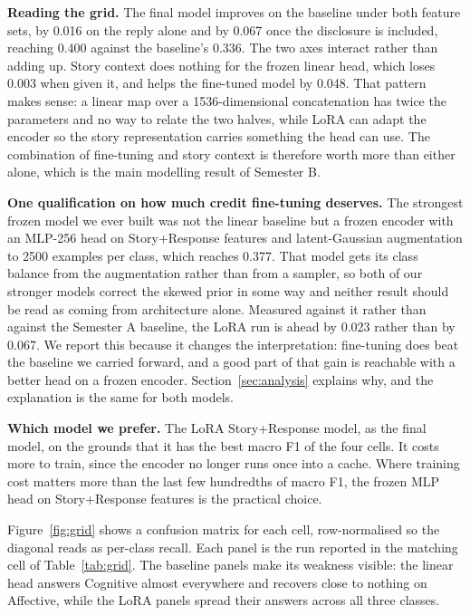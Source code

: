 \documentclass[11pt,a4paper]{article}
\begin{document}
\textbf{Reading the grid.} The final model improves on the baseline under both feature sets,
by 0.016 on the reply alone and by 0.067 once the disclosure is included, reaching 0.400
against the baseline's 0.336. The two axes interact rather than adding
up. Story context does nothing for the frozen linear head, which loses 0.003 when given it,
and helps the fine-tuned model by 0.048. That pattern makes sense: a linear map over a
1536-dimensional concatenation has twice the parameters and no way to relate the two halves,
while LoRA can adapt the encoder so the story representation carries something the head can
use. The combination of fine-tuning and story context is therefore worth more than either
alone, which is the main modelling result of Semester B.

\textbf{One qualification on how much credit fine-tuning deserves.} The strongest frozen
model we ever built was not the linear baseline but a frozen encoder with an MLP-256 head on
Story+Response features and latent-Gaussian augmentation to 2500 examples per class, which
reaches 0.377. That model gets its class balance from the augmentation rather than from a
sampler, so both of our stronger models correct the skewed prior in some way and neither
result should be read as coming from architecture alone. Measured against it rather than
against the Semester A baseline, the LoRA run is ahead by 0.023 rather than by 0.067. We
report this because it changes the interpretation: fine-tuning does beat the baseline we
carried forward, and a good part of that gain is reachable with a better head on a frozen
encoder. Section~\ref{sec:analysis} explains why,
and the explanation is the same for both models.

\textbf{Which model we prefer.} The LoRA Story+Response model, as the final model, on the
grounds that it has the best macro F1 of the four cells. It costs more to train, since the
encoder no longer runs once into a cache. Where training cost matters more than the last few
hundredths of macro F1, the frozen MLP head on Story+Response features is the practical
choice.

Figure~\ref{fig:grid} shows a confusion matrix for each cell, row-normalised so the
diagonal reads as per-class recall. Each panel is the run reported in the matching cell of
Table~\ref{tab:grid}. The baseline panels make its weakness visible: the linear head answers Cognitive
almost everywhere and recovers close to nothing on Affective, while the LoRA panels spread
their answers across all three classes.
\end{document}
